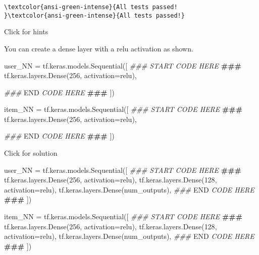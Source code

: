 \documentclass[11pt]{article}
\newenvironment{Shaded}{}{}
\newcommand{\DecValTok}[1]{\textcolor[rgb]{0.25,0.63,0.44}{{#1}}}
\newcommand{\StringTok}[1]{\textcolor[rgb]{0.25,0.44,0.63}{{#1}}}
\newcommand{\CommentTok}[1]{\textcolor[rgb]{0.38,0.63,0.69}{\textit{{#1}}}}
\newcommand{\AlertTok}[1]{\textcolor[rgb]{1.00,0.00,0.00}{\textbf{{#1}}}}
\newcommand{\RegionMarkerTok}[1]{{#1}}
\newcommand{\NormalTok}[1]{{#1}}
\newcommand{\OperatorTok}[1]{\textcolor[rgb]{0.40,0.40,0.40}{{#1}}}
\begin{document}
    \begin{Verbatim}[commandchars=\\\{\}]
\textcolor{ansi-green-intense}{All tests passed!
}\textcolor{ansi-green-intense}{All tests passed!}
    \end{Verbatim}

    Click for hints

You can create a dense layer with a relu activation as shown.

\begin{Shaded}
\begin{Highlighting}[]
\NormalTok{user\_NN }\OperatorTok{=}\NormalTok{ tf.keras.models.Sequential([}
    \CommentTok{\#\#\# START CODE HERE }\AlertTok{\#\#\#}\CommentTok{     }
\NormalTok{  tf.keras.layers.Dense(}\DecValTok{256}\NormalTok{, activation}\OperatorTok{=}\StringTok{\textquotesingle{}relu\textquotesingle{}}\NormalTok{),}

    
    \CommentTok{\#\#\# }\RegionMarkerTok{END}\CommentTok{ CODE HERE }\AlertTok{\#\#\#}\CommentTok{  }
\NormalTok{])}

\NormalTok{item\_NN }\OperatorTok{=}\NormalTok{ tf.keras.models.Sequential([}
    \CommentTok{\#\#\# START CODE HERE }\AlertTok{\#\#\#}\CommentTok{     }
\NormalTok{  tf.keras.layers.Dense(}\DecValTok{256}\NormalTok{, activation}\OperatorTok{=}\StringTok{\textquotesingle{}relu\textquotesingle{}}\NormalTok{),}

    
    \CommentTok{\#\#\# }\RegionMarkerTok{END}\CommentTok{ CODE HERE }\AlertTok{\#\#\#}\CommentTok{  }
\NormalTok{])}
\end{Highlighting}
\end{Shaded}

Click for solution

\begin{Shaded}
\begin{Highlighting}[]
\NormalTok{user\_NN }\OperatorTok{=}\NormalTok{ tf.keras.models.Sequential([}
    \CommentTok{\#\#\# START CODE HERE }\AlertTok{\#\#\#}\CommentTok{     }
\NormalTok{  tf.keras.layers.Dense(}\DecValTok{256}\NormalTok{, activation}\OperatorTok{=}\StringTok{\textquotesingle{}relu\textquotesingle{}}\NormalTok{),}
\NormalTok{  tf.keras.layers.Dense(}\DecValTok{128}\NormalTok{, activation}\OperatorTok{=}\StringTok{\textquotesingle{}relu\textquotesingle{}}\NormalTok{),}
\NormalTok{  tf.keras.layers.Dense(num\_outputs),}
    \CommentTok{\#\#\# }\RegionMarkerTok{END}\CommentTok{ CODE HERE }\AlertTok{\#\#\#}\CommentTok{  }
\NormalTok{])}

\NormalTok{item\_NN }\OperatorTok{=}\NormalTok{ tf.keras.models.Sequential([}
    \CommentTok{\#\#\# START CODE HERE }\AlertTok{\#\#\#}\CommentTok{     }
\NormalTok{  tf.keras.layers.Dense(}\DecValTok{256}\NormalTok{, activation}\OperatorTok{=}\StringTok{\textquotesingle{}relu\textquotesingle{}}\NormalTok{),}
\NormalTok{  tf.keras.layers.Dense(}\DecValTok{128}\NormalTok{, activation}\OperatorTok{=}\StringTok{\textquotesingle{}relu\textquotesingle{}}\NormalTok{),}
\NormalTok{  tf.keras.layers.Dense(num\_outputs),}
    \CommentTok{\#\#\# }\RegionMarkerTok{END}\CommentTok{ CODE HERE }\AlertTok{\#\#\#}\CommentTok{  }
\NormalTok{])}
\end{Highlighting}
\end{Shaded}
\end{document}
